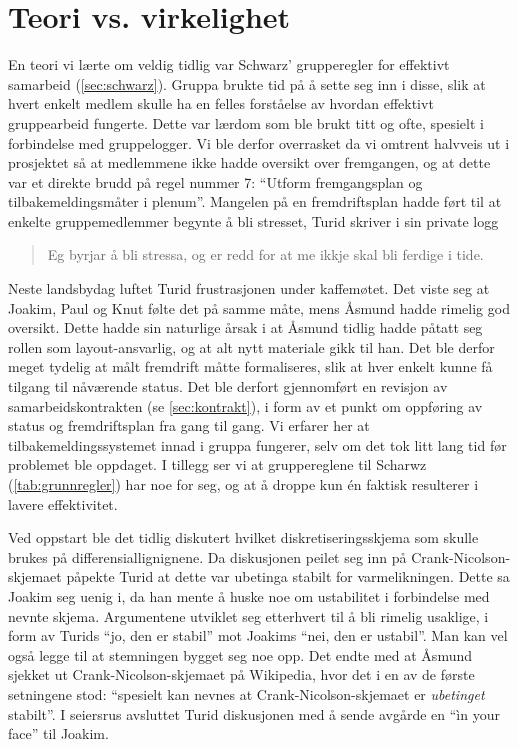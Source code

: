 \section{Teori vs. virkelighet}
En teori vi lærte om veldig tidlig var Schwarz' grupperegler for effektivt
samarbeid (\cref{sec:schwarz}). Gruppa brukte tid på å sette seg inn i disse, slik at
hvert enkelt medlem skulle ha en felles forståelse av hvordan effektivt
gruppearbeid fungerte. Dette var lærdom som ble brukt titt og ofte, spesielt i
forbindelse med gruppelogger. Vi ble derfor overrasket da vi omtrent halvveis ut
i prosjektet så at medlemmene ikke hadde oversikt over fremgangen, og at dette var et
direkte brudd på regel nummer 7: ``Utform fremgangsplan og tilbakemeldingsmåter
i plenum''. Mangelen på en fremdriftsplan hadde ført til at enkelte
gruppemedlemmer begynte å bli stresset, Turid skriver i sin private logg 
\begin{quote}
Eg byrjar å bli stressa, og er redd for at me ikkje skal bli ferdige i tide.
\end{quote}

Neste landsbydag luftet Turid frustrasjonen under kaffemøtet. Det viste seg at
Joakim, Paul og Knut følte det på samme måte, mens Åsmund hadde rimelig god
oversikt. Dette hadde sin naturlige årsak i at Åsmund tidlig hadde påtatt seg
rollen som layout-ansvarlig, og at alt nytt materiale gikk til han. Det ble
derfor meget tydelig at målt fremdrift måtte formaliseres, slik at hver enkelt
kunne få tilgang til nåværende status. Det ble derfort gjennomført en revisjon
av samarbeidskontrakten (se \cref{sec:kontrakt}), i form av et punkt om oppføring av
status og fremdriftsplan fra gang til gang. Vi erfarer her at
tilbakemeldingssystemet innad i gruppa fungerer, selv om det tok litt lang tid
før problemet ble oppdaget. I tillegg ser vi at gruppereglene til Scharwz
(\cref{tab:grunnregler}) har noe for seg, og at å droppe kun én faktisk
resulterer i lavere effektivitet. 

Ved oppstart ble det tidlig diskutert hvilket diskretiseringsskjema som skulle
brukes på differensiallignignene. Da diskusjonen peilet seg inn på
Crank-Nicolson-skjemaet påpekte Turid at dette var ubetinga stabilt for varmelikningen. Dette
sa Joakim seg uenig i, da han mente å huske noe om ustabilitet i forbindelse med
nevnte skjema. Argumentene utviklet seg etterhvert til å bli rimelig usaklige, i
form av Turids ``jo, den er stabil'' mot Joakims ``nei, den er ustabil''. Man
kan vel også legge til at stemningen bygget seg noe opp. Det endte med at Åsmund
sjekket ut Crank-Nicolson-skjemaet på Wikipedia, hvor det i en av de første
setningene stod: ``spesielt kan nevnes at Crank-Nicolson-skjemaet er
\emph{ubetinget} stabilt''. I seiersrus avsluttet Turid diskusjonen med å sende
avgårde en ``ìn your face'' til Joakim.

